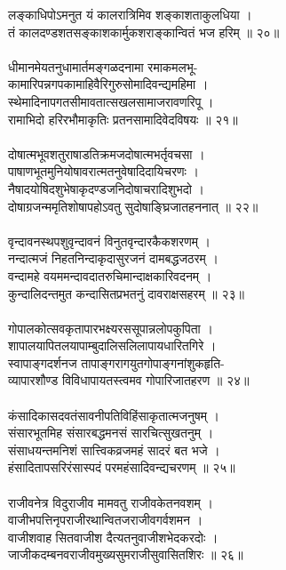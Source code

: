 लङ्काधिपोऽमनुत यं कालरात्रिमिव शङ्काशताकुलधिया  ।\\
तं कालदण्डशतसङ्काशकार्मुकशराङ्कान्वितं भज हरिम्  ॥ २०॥\\
\\
धीमानमेयतनुधामार्तमङ्गळदनामा रमाकमलभू-\\
कामारिपन्नगपकामाहिवैरिगुरुसोमादिवन्द्यमहिमा  ।\\
स्थेमादिनापगतसीमावतात्सखलसामाजरावणरिपू  ।\\
रामाभिदो हरिरभौमाकृतिः प्रतनसामादिवेदविषयः  ॥ २१॥\\
\\
दोषात्मभूवशतुराषाडतिक्रमजदोषात्मभर्तृवचसा  ।\\
पाषाणभूतमुनियोषावरात्मतनुवेषादिदायिचरणः  ।\\
नैषादयोषिदशुभेषाकृदण्डजनिदोषाचरादिशुभदो  ।\\
दोषाग्रजन्ममृतिशोषापहोऽवतु सुदोषाङ्घ्रिजातहननात्  ॥ २२॥\\
\\
वृन्दावनस्थपशुवृन्दावनं विनुतवृन्दारकैकशरणम्  ।\\
नन्दात्मजं निहतनिन्दाकृदासुरजनं दामबद्धजठरम्  ।\\
वन्दामहे वयममन्दावदातरुचिमान्दाक्षकारिवदनम्  ।\\
कुन्दालिदन्तमुत कन्दासितप्रभतनुं दावराक्षसहरम्  ॥ २३॥\\
\\
गोपालकोत्सवकृतापारभक्ष्यरससूपान्नलोपकुपिता  ।\\
शापालयापितलयापाम्बुदालिसलिलापायधारितगिरे  ।\\
स्वापाङ्गदर्शनज तापाङ्गरागयुतगोपाङ्गनांशुकहृति-\\
व्यापारशौण्ड विविधापायतस्त्वमव गोपारिजातहरण  ॥ २४॥\\
\\
कंसादिकासदवतंसावनीपतिविहिंसाकृतात्मजनुषम्  ।\\
संसारभूतमिह संसारबद्धमनसं सारचित्सुखतनुम्  ।\\
संसाधयन्तमनिशं सात्त्विकव्रजमहं सादरं बत भजे  ।\\
हंसादितापसरिरंसास्पदं परमहंसादिवन्द्यचरणम्  ॥ २५॥\\
\\
राजीवनेत्र विदुराजीव मामवतु राजीवकेतनवशम्  ।\\
वाजीभपत्तिनृपराजीरथान्वितजराजीवगर्वशमन  ।\\
वाजीशवाह सितवाजीश दैत्यतनुवाजीशभेदकरदोः  ।\\
जाजीकदम्बनवराजीवमुख्यसुमराजीसुवासितशिरः  ॥ २६॥\\
\\
